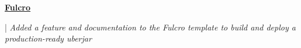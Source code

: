 \documentclass[letterpaper,11pt]{article}
\begin{document}
  \begin{minipage}[t]{0.08\textwidth}
    \raggedright
    \href{https://github.com/fulcrologic/fulcro-template/pull/28}{ \underline{\textbf{Fulcro}}} \\
  \end{minipage}
  \hfill
  \begin{minipage}[t]{0.90\textwidth}
    \raggedright
    |\textit{ Added a feature and documentation to the Fulcro template to build and deploy a production-ready uberjar } \\
  \end{minipage}
  
\end{document}
